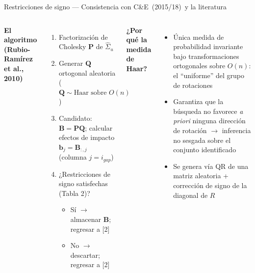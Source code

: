 \documentclass[aspectratio=169, 10pt]{beamer}
\newcommand{\CE}{C\&E~(2015/18)}
\begin{document}
\begin{frame}{Restricciones de signo — Consistencia con \CE\ y la literatura}

  \begin{columns}[T]

    \textbf{\small El algoritmo (Rubio-Ramírez et al., 2010)}
    \vspace{3pt}
    \begin{enumerate}\setlength\itemsep{5pt}
      \item[\textbf{[1]}] Factorización de Cholesky $\mathbf{P}$ de $\hat{\Sigma}_u$
      \item[\textbf{[2]}] Generar $\mathbf{Q}$ ortogonal aleatoria
            ($\mathbf{Q} \sim \text{Haar sobre } O(n)$)
      \item[\textbf{[3]}] Candidato: $\mathbf{B} = \mathbf{P}\mathbf{Q}$;
            calcular efectos de impacto
            $\mathbf{b}_j = \mathbf{B}_{:,j}$ (columna $j = i_{gap}$)
      \item[\textbf{[4]}] ¿Restricciones de signo satisfechas (Tabla 2)?
        \begin{itemize}
          \item Sí $\to$ almacenar $\mathbf{B}$; regresar a [2]
          \item No $\to$ descartar; regresar a [2]
        \end{itemize}
    \end{enumerate}

    \vspace{6pt}
    \textbf{\small ¿Por qué la medida de Haar?}
    \begin{itemize}\setlength\itemsep{3pt}
      \item \alert{Única} medida de probabilidad invariante bajo
            transformaciones ortogonales sobre $O(n)$: el ``uniforme''
            del grupo de rotaciones
      \item Garantiza que la búsqueda no favorece \textit{a priori}
            ninguna dirección de rotación $\to$ inferencia no sesgada
            sobre el conjunto identificado
      \item Se genera vía QR de una matriz aleatoria + corrección de
            signo de la diagonal de $R$
    \end{itemize}


\end{columns}
\end{frame}
\end{document}
